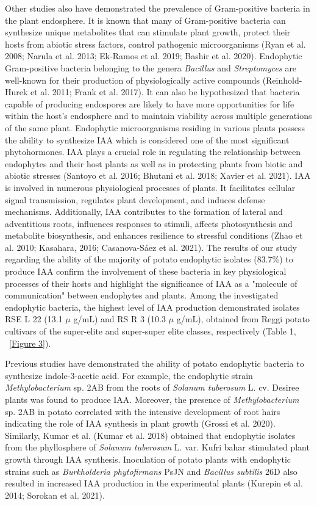 \documentclass[sn-mathphys,Numbered]{sn-jnl}%
\theoremstyle{thmstyleone}%
\theoremstyle{thmstyletwo}%
\theoremstyle{thmstylethree}%
\begin{document}
Other studies also have demonstrated the prevalence of Gram-positive bacteria in the plant endosphere. It is known that many of Gram-positive bacteria can synthesize unique metabolites that can stimulate plant growth, protect their hosts from abiotic stress factors, control pathogenic microorganisms (Ryan et al. 2008; Narula et al. 2013; Ek-Ramos et al. 2019; Bashir et al. 2020). Endophytic Gram-positive bacteria belonging to the genera \textit{Bacillus} and \textit{Streptomyces} are well-known for their production of physiologically active compounds (Reinhold-Hurek et al. 2011; Frank et al. 2017). It can also be hypothesized that bacteria capable of producing endospores are likely to have more opportunities for life within the host's endosphere and to maintain viability across multiple generations of the same plant.
Endophytic microorganisms residing in various plants possess the ability to synthesize IAA which is considered one of the most significant phytohormones. IAA plays a crucial role in regulating the relationship between endophytes and their host plants as well as in protecting plants from biotic and abiotic stresses (Santoyo et al. 2016; Bhutani et al. 2018; Xavier et al. 2021). IAA is involved in numerous physiological processes of plants. It facilitates cellular signal transmission, regulates plant development, and induces defense mechanisms. Additionally, IAA contributes to the formation of lateral and adventitious roots, influences responses to stimuli, affects photosynthesis and metabolite biosynthesis, and enhances resilience to stressful conditions (Zhao et al. 2010; Kasahara, 2016; Casanova-Sáez et al. 2021).
The results of our study regarding the ability of the majority of potato endophytic isolates (83.7\%) to produce IAA confirm the involvement of these bacteria in key physiological processes of their hosts and highlight the significance of IAA as a "molecule of communication" between endophytes and plants. Among the investigated endophytic bacteria, the highest level of IAA production demonstrated isolates RSE L 22 (13.1 $\mu$ g/mL) and RS R 3 (10.3 $\mu$ g/mL), obtained from Reggi potato cultivars of the super-elite and super-super elite classes, respectively (Table 1, ~\ref{Figure 3}).

Previous studies have demonstrated the ability of potato endophytic bacteria to synthesize indole-3-acetic acid. For example, the endophytic strain \textit{Methylobacterium} sp. 2AB from the roots of \textit{Solanum tuberosum} L. cv. Desiree plants was found to produce IAA. Moreover, the presence of \textit{Methylobacterium} sp. 2AB in potato correlated with the intensive development of root hairs indicating the role of IAA synthesis in plant growth (Grossi et al. 2020). Similarly, Kumar et al.  (Kumar et al.  2018) obtained that endophytic isolates from the phyllosphere of \textit{Solanum tuberosum} L. var. Kufri bahar stimulated plant growth through IAA synthesis. Inoculation of potato plants with endophytic strains such as \textit{Burkholderia phytofirmans} PsJN and \textit{Bacillus subtilis} 26D also resulted in increased IAA production in the experimental plants (Kurepin et al. 2014; Sorokan et al. 2021).
\end{document}
